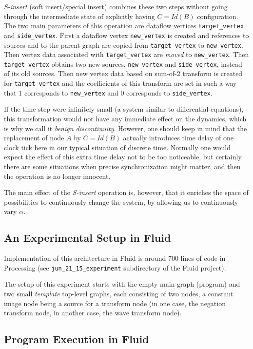 \documentclass{llncs}
\begin{document}
{\em S-insert} (soft insert/special insert) combines these two steps without going through the intermediate state of explicitly having $C=Id(B)$ configuration. The two main
parameters of this operation are dataflow vertices {\tt target\_vertex} and {\tt side\_vertex}. First a dataflow vertex {\tt new\_vertex} is created
and references to sources and to the parent graph are copied from {\tt target\_vertex} to  {\tt new\_vertex}. Then vertex data associated with
{\tt target\_vertex} are {\em moved} to {\tt new\_vertex}. Then {\tt target\_vertex} obtains two new sources,  
{\tt new\_vertex} and {\tt side\_vertex}, instead of its old sources. Then new vertex data based on sum-of-2 transform is created for
{\tt target\_vertex} and the coefficients of this transform are set in such a way that 1 corresponds to {\tt new\_vertex}
and 0 corresponds to {\tt side\_vertex}.

If the time step were infinitely small (a system similar to differential equations), 
this transformation would not have any immediate effect on the dynamics, which is
why we call it {\em benign discontinuity}. However, one should keep in mind that the replacement of
node $A$ by $C=Id(B)$ actually introduces time delay of one clock tick here in our
typical situation of discrete time. Normally one would expect the effect of this
extra time delay not to be too noticeable, but certainly there are some situations
when precise synchronization might matter, and then the operation is no longer
innocent.

The main effect of the {\em S-insert} operation is, however, that it enriches the space of
possibilities to continuously change the system, by allowing us to continuously
vary $\alpha$. 

\subsection{An Experimental Setup in Fluid}

Implementation of this architecture in Fluid is around 700 lines of code in Processing
 (see {\tt jun\_21\_15\_experiment} subdirectory of the Fluid project).

The setup of this experiment starts with the empty main graph (program) and
two small {\em template} top-level graphs, each consisting of two nodes, a constant image node
being a source for a transform node (in one case, the negation transform node,
in another case, the wave transform node).

\subsection{Program Execution in Fluid}\label{continuous_fluid}
\end{document}
